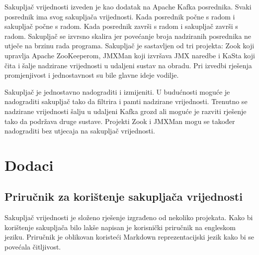 \documentclass[utf8, diplomski, lmodern, numeric]{fer}
\begin{document}
Sakupljač vrijednosti izveden je kao dodatak na Apache Kafka posrednika. Svaki posrednik ima svog sakupljača vrijednosti. Kada posrednik počne s radom i sakupljač počne s radom. Kada posrednik završi s radom i sakupljač završi s radom. Sakupljač se izvrsno skalira jer povećanje broja nadziranih posrednika ne utječe na brzinu rada programa. Sakupljač je sastavljen od tri projekta: Zook koji upravlja Apache ZooKeeperom, JMXMan koji izvršava JMX naredbe i KaSta koji čita i šalje nadzirane vrijednosti u udaljeni sustav na obradu. Pri izvedbi rješenja promjenjivost i jednostavnost su bile glavne ideje vodilje.

Sakupljač je jednostavno nadograditi i izmijeniti. U budućnosti moguće je nadograditi sakupljač tako da filtrira i pamti nadzirane vrijednosti. Trenutno se nadzirane vrijednosti šalju u udaljeni Kafka grozd ali moguće je razviti rješenje tako da podržava druge sustave. Projekti Zook i JMXMan mogu se također nadograditi bez utjecaja na sakupljač vrijednosti.



\chapter{Dodaci}


\section{Priručnik za korištenje sakupljača vrijednosti}

Sakupljač vrijednosti je složeno rješenje izgrađeno od nekoliko projekata. Kako bi korištenje sakupljača bilo lakše napisan je korisnički priručnik na engleskom jeziku. Priručnik je oblikovan koristeći Markdown reprezentacijski jezik kako bi se povećala čitljivost.
\end{document}

